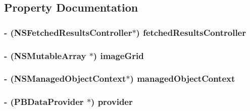 \subsection{Property Documentation}
\hypertarget{interface_p_b_master_view_controller_a770ae0f08b365d8af9a206e04d22052f}{
\subsubsection[{fetchedResultsController}]{\setlength{\rightskip}{0pt plus 5cm}-\/ (NSFetchedResultsController$\ast$) fetchedResultsController}}
\label{interface_p_b_master_view_controller_a770ae0f08b365d8af9a206e04d22052f}
\hypertarget{interface_p_b_master_view_controller_af1e58f8f35c598b9a0083fb119fdfa66}{
\subsubsection[{imageGrid}]{\setlength{\rightskip}{0pt plus 5cm}-\/ (NSMutableArray $\ast$) imageGrid}}
\label{interface_p_b_master_view_controller_af1e58f8f35c598b9a0083fb119fdfa66}
\hypertarget{interface_p_b_master_view_controller_adeebe5deeb50f760daa2b23db0a20d95}{
\subsubsection[{managedObjectContext}]{\setlength{\rightskip}{0pt plus 5cm}-\/ (NSManagedObjectContext$\ast$) managedObjectContext}}
\label{interface_p_b_master_view_controller_adeebe5deeb50f760daa2b23db0a20d95}
\hypertarget{interface_p_b_master_view_controller_a9cc98a5b2cbdf865d98ea86819807de4}{
\subsubsection[{provider}]{\setlength{\rightskip}{0pt plus 5cm}-\/ ({\bf PBDataProvider} $\ast$) provider}}
\label{interface_p_b_master_view_controller_a9cc98a5b2cbdf865d98ea86819807de4}


